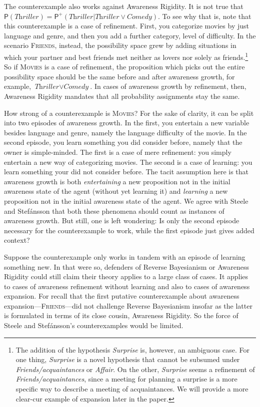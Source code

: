 \documentclass[
  11pt,
  dvipsnames,enabledeprecatedfontcommands]{scrartcl}
\newcommand{\pr}[1]{\ensuremath{\mathsf{P}(#1)}}
\newcommand{\ppr}[2]{\ensuremath{\mathsf{P}^{#1}(#2)}}
\begin{document}
The counterexample also works against Awareness Rigidity. It is not true
that
\(\pr{\textit{Thriller}}=\ppr{+}{\textit{Thriller} \vert \textit{Thriller}\vee \textit{Comedy}}\).
To see why that is, note that this counterexample is a case of
refinement. First, you categorize movies by just language and genre, and
then you add a further category, level of difficulty. In the scenario
\textsc{Friends}, instead, the possibility space grew by adding
situations in which your partner and best friends met neither as lovers
nor solely as friends.\footnote{The addition of the hypothesis
  \textit{Surprise} is, however, an ambiguous case. For one thing,
  \textit{Surprise} is a novel hypothesis that cannot be subsumed under
  \textit{Friends/acquaintances} or \textit{Affair}. On the other,
  \textit{Surprise} seems a refinement of
  \textit{Friends/acquaintances}, since a meeting for planning a
  surprise is a more specific way to describe a meeting of
  acquaintances. We will provide a more clear-cur example of expansion
  later in the paper.} So if \textsc{Movies} is a case of refinement,
the proposition which picks out the entire possibility space should be
the same before and after awareness growth, for example,
\(\textit{Thriller}\vee \textit{Comedy}\). In cases of awareness growth
by refinement, then, Awareness Rigidity mandates that all probability
assignments stay the same.

How strong of a counterexample is \textsc{Movies}? For the sake of
clarity, it can be split into two episodes of awareness growth. In the
first, you entertain a new variable besides language and genre, namely
the language difficulty of the movie. In the second episode, you learn
something you did consider before, namely that the owner is
simple-minded. The first is a case of mere refinement: you simply
entertain a new way of categorizing movies. The second is a case of
learning: you learn something your did not consider before. The tacit
assumption here is that awareness growth is both \textit{entertaining} a
new proposition not in the initial awareness state of the agent (without
yet learning it) and \textit{learning} a new proposition not in the
initial awareness state of the agent. We agree with Steele and
Stefánsson that both these phenomena should count as instances of
awareness growth. But still, one is left wondering: Is only the second
episode necessary for the counterexample to work, while the first
episode just gives added context?

Suppose the counterexample only works in tandem with an episode of
learning something new. In that were so, defenders of Reverse
Bayesianism or Awareness Rigidity could still claim their theory applies
to a large class of cases. It applies to cases of awareness refinement
without learning and also to cases of awareness expansion. For recall
that the first putative counterexample about awareness
expansion---\textsc{Friends}---did not challenge Reverse Bayesianism
insofar as the latter is formulated in terms of its close cousin,
Awareness Rigidity. So the force of Steele and Stefánsson's
counterexamples would be limited.
\end{document}
